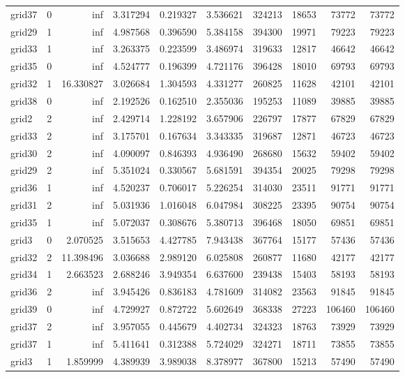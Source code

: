 \begin{longtable}{|l|r|r|r|r|r|r|r|r|r|}
grid37 & 0 & inf & 3.317294 & 0.219327 & 3.536621 & 324213 & 18653 & 73772 & 73772 \\
grid29 & 1 & inf & 4.987568 & 0.396590 & 5.384158 & 394300 & 19971 & 79223 & 79223 \\
grid33 & 1 & inf & 3.263375 & 0.223599 & 3.486974 & 319633 & 12817 & 46642 & 46642 \\
grid35 & 0 & inf & 4.524777 & 0.196399 & 4.721176 & 396428 & 18010 & 69793 & 69793 \\
grid32 & 1 & 16.330827 & 3.026684 & 1.304593 & 4.331277 & 260825 & 11628 & 42101 & 42101 \\
grid38 & 0 & inf & 2.192526 & 0.162510 & 2.355036 & 195253 & 11089 & 39885 & 39885 \\
grid2 & 2 & inf & 2.429714 & 1.228192 & 3.657906 & 226797 & 17877 & 67829 & 67829 \\
grid33 & 2 & inf & 3.175701 & 0.167634 & 3.343335 & 319687 & 12871 & 46723 & 46723 \\
grid30 & 2 & inf & 4.090097 & 0.846393 & 4.936490 & 268680 & 15632 & 59402 & 59402 \\
grid29 & 2 & inf & 5.351024 & 0.330567 & 5.681591 & 394354 & 20025 & 79298 & 79298 \\
grid36 & 1 & inf & 4.520237 & 0.706017 & 5.226254 & 314030 & 23511 & 91771 & 91771 \\
grid31 & 2 & inf & 5.031936 & 1.016048 & 6.047984 & 308225 & 23395 & 90754 & 90754 \\
grid35 & 1 & inf & 5.072037 & 0.308676 & 5.380713 & 396468 & 18050 & 69851 & 69851 \\
grid3 & 0 & 2.070525 & 3.515653 & 4.427785 & 7.943438 & 367764 & 15177 & 57436 & 57436 \\
grid32 & 2 & 11.398496 & 3.036688 & 2.989120 & 6.025808 & 260877 & 11680 & 42177 & 42177 \\
grid34 & 1 & 2.663523 & 2.688246 & 3.949354 & 6.637600 & 239438 & 15403 & 58193 & 58193 \\
grid36 & 2 & inf & 3.945426 & 0.836183 & 4.781609 & 314082 & 23563 & 91845 & 91845 \\
grid39 & 0 & inf & 4.729927 & 0.872722 & 5.602649 & 368338 & 27223 & 106460 & 106460 \\
grid37 & 2 & inf & 3.957055 & 0.445679 & 4.402734 & 324323 & 18763 & 73929 & 73929 \\
grid37 & 1 & inf & 5.411641 & 0.312388 & 5.724029 & 324271 & 18711 & 73855 & 73855 \\
grid3 & 1 & 1.859999 & 4.389939 & 3.989038 & 8.378977 & 367800 & 15213 & 57490 & 57490 \\

\end{longtable}
